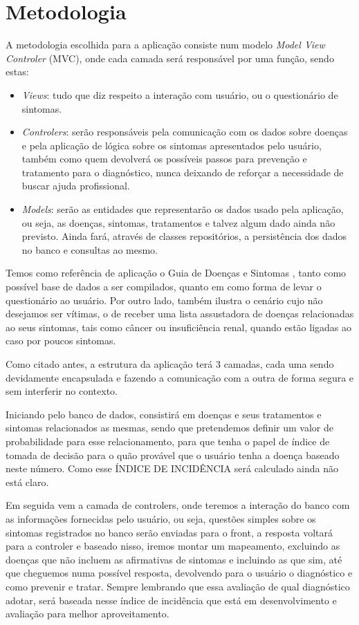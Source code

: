 \section{Metodologia}

A metodologia escolhida para a aplicação consiste num modelo \emph{Model View Controler} (MVC), onde cada camada será responsável por uma função, sendo estas:
\begin{itemize}
    \item \emph{Views}: tudo que diz respeito a interação com usuário, ou o questionário de sintomas.
    \item \emph{Controlers}: serão responsáveis pela comunicação com os dados sobre doenças e pela aplicação de lógica sobre os sintomas apresentados pelo usuário, também como quem devolverá os possíveis passos para prevenção e tratamento para o diagnóstico, nunca deixando de reforçar a necessidade de buscar ajuda profissional.
    \item \emph{Models}: serão as entidades que representarão os dados usado pela aplicação, ou seja, as doenças, sintomas, tratamentos e talvez algum dado ainda não previsto. Ainda fará, através de classes repositórios, a persistência dos dados no banco e consultas ao mesmo.
\end{itemize}


Temos como referência de aplicação o Guia de Doenças e Sintomas \cite{alberteinstein}, tanto como possível base de dados a ser compilados, quanto em como forma de levar o questionário ao usuário.
Por outro lado, também ilustra o cenário cujo não desejamos ser vítimas, o de receber uma lista assustadora de doenças relacionadas ao seus sintomas, tais como câncer ou insuficiência renal, quando estão ligadas ao caso por poucos sintomas.


Como citado antes, a estrutura da aplicação terá 3 camadas, cada uma sendo devidamente encapsulada e fazendo a comunicação com a outra de forma segura e sem interferir no contexto.

Iniciando pelo banco de dados, consistirá em  doenças e seus tratamentos e sintomas relacionados as mesmas, sendo que pretendemos definir um valor de probabilidade para esse relacionamento, para que tenha o papel de índice de tomada de decisão para o quão provável   que o usuário tenha a doença baseado neste número. Como esse ÍNDICE DE INCIDÊNCIA será calculado ainda não está claro.

Em seguida vem a camada de controlers, onde teremos a interação do banco com as informações fornecidas pelo usuário, ou seja, questões simples sobre os sintomas registrados no banco serão enviadas para o front, a resposta voltará para a controler e baseado nisso, iremos montar um mapeamento, excluindo as doenças que não incluem as afirmativas de sintomas e incluindo as que sim, até que cheguemos numa possível resposta, devolvendo para o usuário o diagnóstico e como prevenir e tratar.
Sempre lembrando que essa avaliação de qual diagnóstico adotar, será baseada nesse índice de incidência que está em desenvolvimento e avaliação para melhor aproveitamento.


